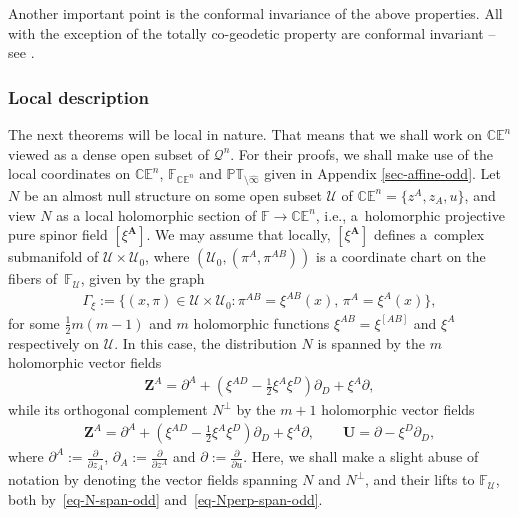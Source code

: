 \documentclass[10pt,a4paper]{amsart}
\numberwithin{equation}{section}
\newcommand{\parderv}[2] {\frac{\partial#1}{\partial#2}}
\newcommand{\mbf} [1]{\mathbf{#1}}
\newcommand{\mc} [1]{\mathcal{#1}}
\newcommand{\PT} {\mathbb{PT}}
\newcommand{\E} {\mathbb{E}}
\newcommand{\C} {\mathbb{C}}
\newcommand{\F} {\mathbb{F}}
\begin{document}
Another important point is the conformal invariance of the above properties. All with the exception of the totally co-geodetic property are conformal invariant -- see \cite{Taghavi-Chabert2013}.

\subsubsection{Local description}\label{sec-null-strc-desc}
The next theorems will be local in nature. That means that we shall work on $\C \E^n$ viewed as a dense open subset of $\mc{Q}^n$. For their proofs, we shall make use of the local coordinates on $\C \E^n$, $\F_{\C\E^n}$ and $\PT_{\setminus \widehat{\infty}}$ given in Appendix \ref{sec-affine-odd}. Let $N$ be an almost null structure on some open subset $\mc{U}$ of $\C \E^n = \{ z^A,z_A,u\}$, and view $N$ as a local holomorphic section of $\F \rightarrow \C \E^n$, i.e., a~holomorphic projective pure spinor f\/ield $[\xi^\mbf{A}]$. We may assume that locally, $[\xi^\mbf{A}]$ def\/ines a~complex submanifold of $\mc{U} \times \mc{U}_0$, where $(\mc{U}_0 , ( \pi^A , \pi^{AB} ))$ is a coordinate chart on the f\/ibers of~$\F_\mc{U}$, given by the graph
\begin{gather}\label{eq-graph-xi}
\Gamma_\xi := \big\{ (x,\pi) \in \mc{U} \times \mc{U}_0 \colon \pi^{AB} = \xi^{AB} ( x ) ,\, \pi^{A} = \xi^{A} ( x ) \big\} ,
\end{gather}
for some $\frac{1}{2}m(m-1)$ and $m$ holomorphic functions $\xi^{AB}=\xi^{[AB]}$ and $\xi^{A}$ respectively on $\mc{U}$. In this case, the distribution $N$ is spanned by the $m$ holomorphic vector f\/ields
\begin{gather}\label{eq-N-span-odd}
\bm{Z}^{A} = \partial ^{A} + \left( \xi^{AD} - \tfrac{1}{2} \xi^{A} \xi^{D} \right) \partial _{D} + \xi^{A} \partial ,
\end{gather}
while its orthogonal complement $N^\perp$ by the $m+1$ holomorphic vector f\/ields
\begin{gather}\label{eq-Nperp-span-odd}
\bm{Z}^{A} = \partial ^{A} + \left( \xi^{AD} - \tfrac{1}{2} \xi^{A} \xi^{D} \right) \partial _{D} + \xi^{A} \partial , \qquad \bm{U} = \partial - \xi^{D} \partial _{D} ,
\end{gather}
where $\partial^A := \parderv{}{z_A}$, $\partial_A := \parderv{}{z^A}$ and $\partial := \parderv{}{u}$. Here, we shall make a slight abuse of notation by denoting the vector f\/ields spanning $N$ and $N^\perp$, and their lifts to $\F_\mc{U}$, both by~\eqref{eq-N-span-odd} and~\eqref{eq-Nperp-span-odd}.
\end{document}
